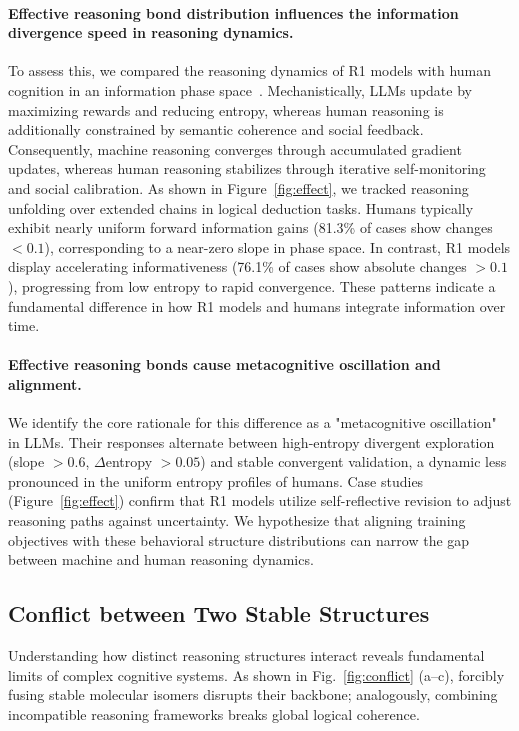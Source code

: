 \paragraph{\textbf{Effective reasoning bond distribution influences the information divergence speed in reasoning dynamics.}}
To assess this, we compared the reasoning dynamics of R1 models with human cognition in an information phase space~\cite{chen2025universal}. Mechanistically, LLMs update by maximizing rewards and reducing entropy, whereas human reasoning is additionally constrained by semantic coherence and social feedback. Consequently, machine reasoning converges through accumulated gradient updates, whereas human reasoning stabilizes through iterative self-monitoring and social calibration.
As shown in Figure~\ref{fig:effect}, we tracked reasoning unfolding over extended chains in logical deduction tasks. Humans typically exhibit nearly uniform forward information gains (81.3\% of cases show changes $<0.1$), corresponding to a near-zero slope in phase space. In contrast, R1 models display accelerating informativeness (76.1\% of cases show absolute changes $>0.1$), progressing from low entropy to rapid convergence. These patterns indicate a fundamental difference in how R1 models and humans integrate information over time.\vspace{-8pt}


\paragraph{\textbf{Effective reasoning bonds cause metacognitive oscillation and alignment.}}
We identify the core rationale for this difference as a "metacognitive oscillation" in LLMs. Their responses alternate between high-entropy divergent exploration (slope \(> 0.6\), \(\Delta\)entropy \(> 0.05\)) and stable convergent validation, a dynamic less pronounced in the uniform entropy profiles of humans. Case studies (Figure~\ref{fig:effect}) confirm that R1 models utilize self-reflective revision to adjust reasoning paths against uncertainty. We hypothesize that aligning training objectives with these behavioral structure distributions can narrow the gap between machine and human reasoning dynamics.


\subsection{Conflict between Two Stable Structures}

Understanding how distinct reasoning structures interact reveals fundamental limits of complex cognitive systems. As shown in Fig.~\ref{fig:conflict} (a–c), forcibly fusing stable molecular isomers disrupts their backbone; analogously, combining incompatible reasoning frameworks breaks global logical coherence.\vspace{-8pt}

